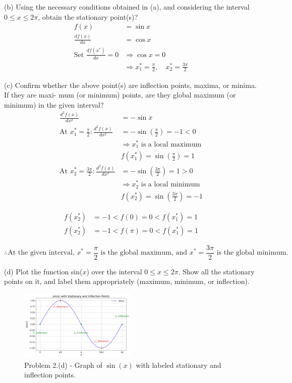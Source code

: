 \documentclass{article} %
\begin{document}
{    \noindent (b) Using the necessary conditions obtained in (a), and considering the interval $ 0 \leq x \leq 2\pi $, obtain
    the stationary point(s)? 
    \begin{align*}
    f(x) &= \sin x \\
    \frac{df(x)}{dx} &= \cos x \\
    \text{Set } \frac{df(x^*)}{dx} = 0 &\Rightarrow \cos x = 0 \\
    &\Rightarrow x_1^* = \frac{\pi}{2}, \quad x_2^* = \frac{3\pi}{2}
    \end{align*}

    \noindent (c) Confirm whether the above point(s) are inflection points, maxima, or minima. If they are maxi-
    mum (or minimum) points, are they global maximum (or minimum) in the given interval?
    \begin{align*}
    \frac{d^2 f(x)}{dx^2} &= -\sin x \\
    \text{At } x_1^* = \frac{\pi}{2}: \frac{d^2 f(x)}{dx^2} &= -\sin\left(\frac{\pi}{2}\right) = -1 < 0 \\
    &\Rightarrow x_1^* \text{ is a local maximum} \\
    &f(x_1^*) = \sin\left(\frac{\pi}{2}\right) = 1 \\
    \text{At } x_2^* = \frac{3\pi}{2}: \frac{d^2 f(x)}{dx^2} &= -\sin\left(\frac{3\pi}{2}\right) = 1 > 0 \\
    &\Rightarrow x_2^* \text{ is a local minimum} \\
    &f(x_2^*) = \sin\left(\frac{3\pi}{2}\right) = -1
    \end{align*}

    \begin{align*}
    f(x_2^*) &= -1 < f(0) = 0 < f(x_1^*) = 1 \\
    f(x_2^*) &= -1 < f(\pi) = 0 < f(x_1^*) = 1
    \end{align*}

    \[\therefore \text{At the given interval, } x^* = \frac{\pi}{2} \text{ is the global maximum, and } x^* = \frac{3\pi}{2} \text{ is the global minimum}.\]

    \noindent (d) Plot the function sin($x$) over the interval $ 0 \leq x \leq 2\pi $. Show all the stationary points on it, and
    label them appropriately (maximum, minimum, or inflection). \\
    \begin{figure}[h!]
    \centering
    \includegraphics[width=0.5\textwidth]{generated_image.png}
    \caption{Problem 2.(d) - Graph of $\sin(x)$ with labeled stationary and inflection points.}
    \label{fig1}
    \end{figure}

}
\end{document}
